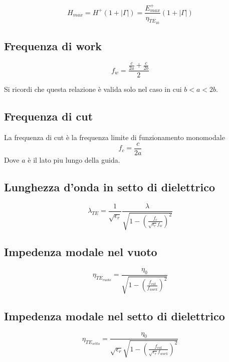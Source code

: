 \documentclass[10pt,a4paper]{report}
\begin{document}
				\begin{equation}
				H_{max}=H^+(1+|\Gamma|)=\frac{E^+_{max}}{\eta_{TE_{10}}}{(1+|\Gamma|)}
				\end{equation}

		\subsection{Frequenza di work}

				\begin{equation}
				f_w=\frac{\frac{c}{2a}+\frac{c}{2b}}{2}
				\end{equation}

				Si ricordi che questa relazione è valida solo nel caso in cui $b<a<2b$.

		\subsection{Frequenza di cut}
	
				La frequenza di cut è la frequenza limite di funzionamento monomodale
				\begin{equation}
				f_c=\frac{c}{2a}
				\end{equation}
				Dove $a$ è il lato piu lungo della guida.

		\subsection{Lunghezza d'onda in setto di dielettrico}

			\begin{equation}
			\lambda_{TE}=\frac{1}{\sqrt{\epsilon_r}}\frac{\lambda}{\sqrt{1- (\frac{f_c}{\sqrt{\epsilon_r}f_w})^2}}
			\end{equation}

		\subsection{Impedenza modale nel vuoto}

				\begin{equation}
				\eta_{TE_{vuoto}}=\frac{\eta_0}{ \sqrt{ 1- ( \frac {f_{cut}} {f_{work}} )^2 } }
				\end{equation}
		\subsection{Impedenza modale nel setto di dielettrico}

				\begin{equation}
				\eta_{TE_{setto}}=\frac{\eta_0}{\sqrt{\epsilon_r} \sqrt{ 1- ( \frac {f_{cut}} {\sqrt{\epsilon_r} f_{work}} )^2 } }
				\end{equation}
\end{document}
